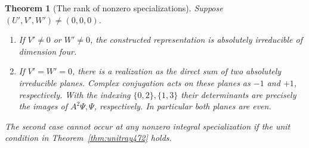\documentclass[a4paper,11pt]{article}
\newtheorem{theorem}[proposition]{Theorem}
\theoremstyle{definition}
\theoremstyle{remark}
\numberwithin{equation}{section}
\begin{document}
\begin{theorem}[The rank of nonzero specializations]\leavevmode
\label{thm:rankdichotomy473}
Suppose \((U',V',W')\ne(0,0,0)\).
\begin{enumerate}
\item If \(V'\ne0\) or \(W'\ne0\), the constructed representation
is absolutely irreducible of dimension four.
\item If \(V'=W'=0\), there is a realization as the direct sum of
two absolutely irreducible planes. Complex conjugation acts on
these planes as \(-1\) and \(+1\), respectively. With the indexing
\(\{0,2\},\{1,3\}\) their determinants are precisely the images
of \(A^2\Psi,\Psi\), respectively. In particular both planes are
even.
\end{enumerate}
The second case cannot occur at any nonzero integral specialization
if the unit condition in Theorem~\ref{thm:unitray472} holds.
\end{theorem}
\end{document}
